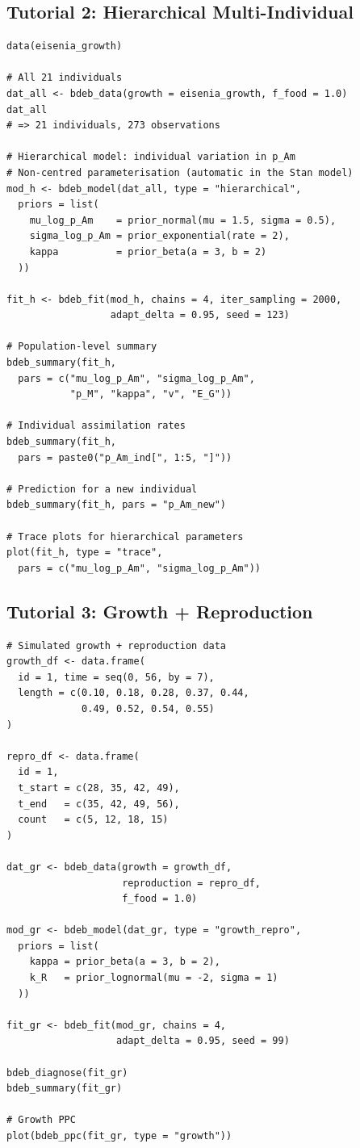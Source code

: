 \documentclass[11pt,a4paper]{article}
\begin{document}
\subsection{Tutorial 2: Hierarchical Multi-Individual}
\label{sec:tut-hierarchical}

\begin{lstlisting}
data(eisenia_growth)

# All 21 individuals
dat_all <- bdeb_data(growth = eisenia_growth, f_food = 1.0)
dat_all
# => 21 individuals, 273 observations

# Hierarchical model: individual variation in p_Am
# Non-centred parameterisation (automatic in the Stan model)
mod_h <- bdeb_model(dat_all, type = "hierarchical",
  priors = list(
    mu_log_p_Am    = prior_normal(mu = 1.5, sigma = 0.5),
    sigma_log_p_Am = prior_exponential(rate = 2),
    kappa          = prior_beta(a = 3, b = 2)
  ))

fit_h <- bdeb_fit(mod_h, chains = 4, iter_sampling = 2000,
                  adapt_delta = 0.95, seed = 123)

# Population-level summary
bdeb_summary(fit_h,
  pars = c("mu_log_p_Am", "sigma_log_p_Am",
           "p_M", "kappa", "v", "E_G"))

# Individual assimilation rates
bdeb_summary(fit_h,
  pars = paste0("p_Am_ind[", 1:5, "]"))

# Prediction for a new individual
bdeb_summary(fit_h, pars = "p_Am_new")

# Trace plots for hierarchical parameters
plot(fit_h, type = "trace",
  pars = c("mu_log_p_Am", "sigma_log_p_Am"))
\end{lstlisting}

\subsection{Tutorial 3: Growth + Reproduction}
\label{sec:tut-growth-repro}

\begin{lstlisting}
# Simulated growth + reproduction data
growth_df <- data.frame(
  id = 1, time = seq(0, 56, by = 7),
  length = c(0.10, 0.18, 0.28, 0.37, 0.44,
             0.49, 0.52, 0.54, 0.55)
)

repro_df <- data.frame(
  id = 1,
  t_start = c(28, 35, 42, 49),
  t_end   = c(35, 42, 49, 56),
  count   = c(5, 12, 18, 15)
)

dat_gr <- bdeb_data(growth = growth_df,
                    reproduction = repro_df,
                    f_food = 1.0)

mod_gr <- bdeb_model(dat_gr, type = "growth_repro",
  priors = list(
    kappa = prior_beta(a = 3, b = 2),
    k_R   = prior_lognormal(mu = -2, sigma = 1)
  ))

fit_gr <- bdeb_fit(mod_gr, chains = 4,
                   adapt_delta = 0.95, seed = 99)

bdeb_diagnose(fit_gr)
bdeb_summary(fit_gr)

# Growth PPC
plot(bdeb_ppc(fit_gr, type = "growth"))
\end{lstlisting}
\end{document}
